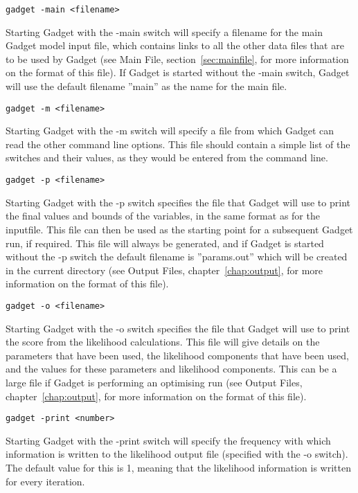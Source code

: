 \documentclass[10pt,twoside]{book}
\begin{document}
{\small\begin{verbatim}
gadget -main <filename>
\end{verbatim}}
Starting Gadget with the -main switch will specify a filename for the main Gadget model input file, which contains links to all the other data files that are to be used by Gadget (see Main File, section~\ref{sec:mainfile}, for more information on the format of this file).  If Gadget is started without the -main switch, Gadget will use the default filename ''main'' as the name for the main file.

{\small\begin{verbatim}
gadget -m <filename>
\end{verbatim}}
Starting Gadget with the -m switch will specify a file from which Gadget can read the other command line options.  This file should contain a simple list of the switches and their values, as they would be entered from the command line.

{\small\begin{verbatim}
gadget -p <filename>
\end{verbatim}}
Starting Gadget with the -p switch specifies the file that Gadget will use to print the final values and bounds of the variables, in the same format as for the inputfile.  This file can then be used as the starting point for a subsequent Gadget run, if required.  This file will always be generated, and if Gadget is started without the -p switch the default filename is ''params.out'' which will be created in the current directory (see Output Files, chapter~\ref{chap:output}, for more information on the format of this file).

{\small\begin{verbatim}
gadget -o <filename>
\end{verbatim}}
Starting Gadget with the -o switch specifies the file that Gadget will use to print the score from the likelihood calculations.  This file will give details on the parameters that have been used, the likelihood components that have been used, and the values for these parameters and likelihood components.  This can be a large file if Gadget is performing an optimising run (see Output Files, chapter~\ref{chap:output}, for more information on the format of this file).

{\small\begin{verbatim}
gadget -print <number>
\end{verbatim}}
Starting Gadget with the -print switch will specify the frequency with which information is written to the likelihood output file (specified with the -o switch).  The default value for this is 1, meaning that the likelihood information is written for every iteration.
\end{document}
